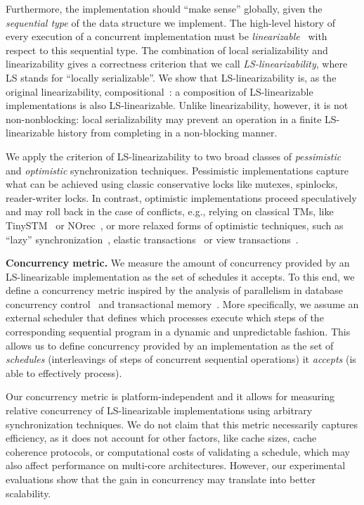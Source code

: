 \documentclass[11pt,pdftex,letterpaper]{article}
\newcommand{\LS}{LS}
\begin{document}
Furthermore, the implementation should ``make sense'' globally, 
given the \emph{sequential type} of the data structure we implement.
The high-level history of every execution 
of a concurrent implementation must be 
\emph{linearizable}~\cite{HW90,AW04} with respect to 
this sequential type.
The combination of local serializability and linearizability gives
a correctness criterion that we call \emph{\LS-linearizability},
where {\LS} stands for ``locally serializable''.
We show that LS-linearizability is, as the original  linearizability,
compositional~\cite{HW90,HS08-book}: a composition of LS-linearizable 
implementations is also LS-linearizable. 
Unlike linearizability, however, it is not non-nonblocking: local
serializability may prevent an operation in a finite LS-linearizable
history from completing in a non-blocking manner. 

We apply the criterion of LS-linearizability to  
two broad classes of \emph{pessimistic} and \emph{optimistic}
synchronization techniques. 
Pessimistic implementations capture what can be achieved 
using classic conservative locks like mutexes, 
spinlocks, reader-writer locks.
In contrast, optimistic implementations proceed speculatively and
may roll back in the case of conflicts, e.g.,  
relying on classical 
TMs, like TinySTM~\cite{FFR08} or NOrec~\cite{norec},  or more relaxed forms of
optimistic techniques, such as ``lazy''
synchronization~\cite{HHL+05},  elastic transactions~\cite{FGG09} or
view transactions~\cite{AMT10}.


\vspace{1mm}\noindent\textbf{Concurrency metric.}
We measure the amount of concurrency provided by an LS-linearizable implementation as the set of schedules it accepts.
To this end, we define a concurrency metric 
inspired by the analysis of parallelism in database concurrency control~\cite{Yan84,Her90}
and transactional memory~\cite{GHF10}.
More specifically, we assume an external scheduler that defines which
processes execute which steps of the corresponding sequential program 
in a dynamic and unpredictable fashion. 
This allows us to define concurrency provided by an implementation as the set of \emph{schedules} 
(interleavings of steps of concurrent sequential operations) 
it \emph{accepts} (is able to effectively process).


Our concurrency metric is platform-independent and it allows for
measuring relative concurrency of LS-linearizable implementations
using arbitrary synchronization techniques.   
We do not claim that this metric necessarily captures 
efficiency, as it does not account for other factors, 
like cache sizes, cache coherence protocols, or computational costs of 
validating a schedule, which may also affect performance on
multi-core architectures.
However, our experimental evaluations show that the gain in concurrency 
may translate into better scalability.
\end{document}

